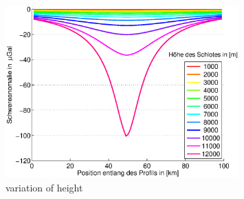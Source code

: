 \documentclass[12pt,a4paper]{scrartcl}
\begin{document}
\begin{figure}[htb]
\centering
\includegraphics[width=0.8\textwidth]{../figures/var_height}
\caption{variation of height}
\label{varheight}
\end{figure}
\end{document}
